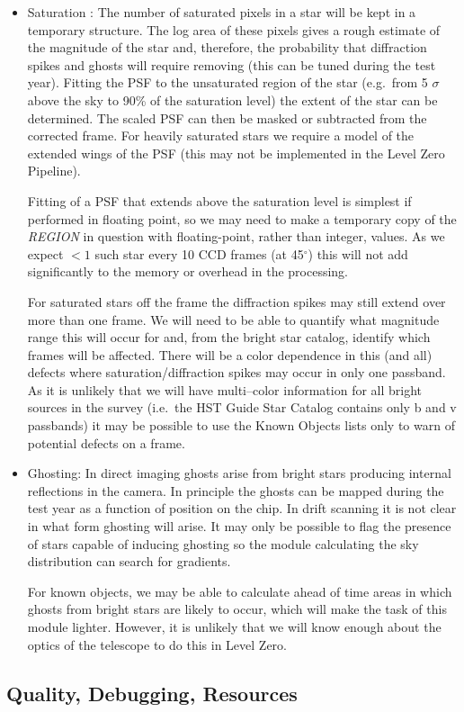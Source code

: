 \begin{itemize}
  \item Saturation : The number of saturated pixels in a star will be
kept in a temporary structure. The log area of these pixels gives
a rough estimate of the magnitude of the star and, therefore, the
probability that diffraction spikes and ghosts will require removing
(this can be tuned
during the test year). Fitting the PSF to the unsaturated region of
the star (e.g.\ from 5 $\sigma$ above the sky to 90\% of the
saturation level) the extent of the star can be determined. The scaled
PSF can then be masked or subtracted from the corrected frame. For
heavily saturated stars we require a model of the extended wings of
the PSF (this may not be implemented in the Level Zero Pipeline).

Fitting of a PSF that extends above the saturation level is simplest if
performed in floating point,
so we may need to make a temporary copy of the {\it REGION} in question
with floating-point, rather than integer, values.
As we expect $<1$  such star every 10
CCD frames (at 45$^\circ$)
this will not add significantly to the memory or overhead in the processing.

For saturated stars off the frame the diffraction spikes may still extend over
more than one frame. We will need to be able to quantify what
magnitude range this will occur for and, from the bright star catalog,
identify which frames will be affected. There will be a color
dependence in this (and all) defects where saturation/diffraction
spikes may occur in only one passband. As it is unlikely that we will
have multi--color information for all bright sources in the survey
(i.e.\ the HST Guide Star Catalog contains only b and v passbands)
it may be possible to use the Known Objects lists
only to warn of potential defects on a frame.

  \item Ghosting: In direct imaging ghosts arise from bright stars producing
internal reflections in the camera. In principle the ghosts can be mapped
during the test year as a function of position on the chip. In drift scanning
it is not clear in what form ghosting will arise. It may only be possible to
flag the presence of stars capable of inducing ghosting so the module
calculating the sky distribution can search for gradients.

For known objects, we may be able to calculate
ahead of time areas in which ghosts from bright stars are likely
to occur, which will make the task of this module lighter.
However,
it is unlikely that we will know enough about the optics of the
telescope to do this in Level Zero.

\end{itemize}

\subsection{Quality, Debugging, Resources}

